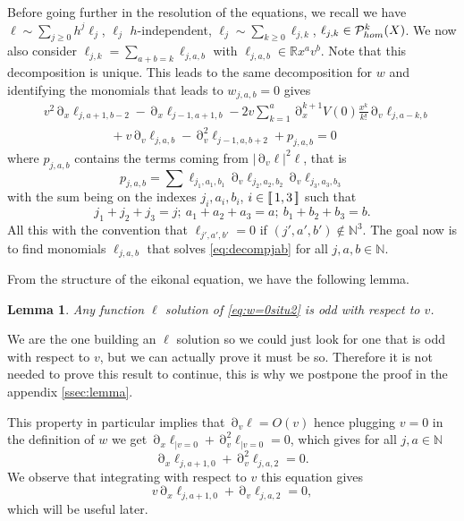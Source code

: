 \documentclass[12pt]{amsart}
\newcommand{\N}{\mathbb N}
\newcommand{\R}{\mathbb R}
\numberwithin{equation}{section}
\numberwithin{figure}{section}
\DeclareMathOperator{\p}{\partial}
\newcommand{\lb}{\operatorname{[\negthinspace [}}
\newcommand{\rb}{\operatorname{]\negthinspace ]}}
\newtheorem{lemma}[defin]{Lemma}
\begin{document}
Before going further in the resolution of the equations, we recall we have $\ell\sim\sum_{j\geq0}h^j\ell_j$, $\ell_j$ $h$-independent, $\ell_j\sim\sum_{k\geq0}\ell_{j,k}$, $\ell_{j,k}\in{\mathcal P}^k_{hom}(X)$. We now also consider $\ell_{j,k} = \sum_{a+b=k}\ell_{j,a,b}$ with $\ell_{j,a,b}\in\R x^av^b$. Note that this decomposition is unique. This leads to the same decomposition for $w$ and identifying the monomials that leads to $w_{j,a,b}=0$ gives
\begin{equation}\label{eq:decompjab}
\begin{aligned}
    &v^2\p_x\ell_{j,a+1,b-2} - \p_x\ell_{j-1,a+1,b} - 2v\sum_{k=1}^a\p_x^{k+1}V(0)\frac{x^k}{k!}\p_v\ell_{j,a-k,b}\\
    &\phantom{********}+ v\p_v\ell_{j,a,b} - \p_v^2\ell_{j-1,a,b+2} + p_{j,a,b} = 0
\end{aligned}
\end{equation}
where $p_{j,a,b}$ contains the terms coming from $|\p_v\ell|^2\ell$, that is
\begin{equation*}
p_{j,a,b} = \sum\ell_{j_1,a_1,b_1}\p_v\ell_{j_2,a_2,b_2}\p_v\ell_{j_3,a_3,b_3}
\end{equation*}
with the sum being on the indexes $j_i,a_i,b_i$, $i\in\lb1,3\rb$ such that
\begin{equation*}
j_1 + j_2 + j_3 = j;\ a_1 + a_2 + a_3 = a;\ b_1 + b_2 + b_3 = b.
\end{equation*}
All this with the convention that $\ell_{j',a',b'} = 0$ if $(j',a',b')\notin\N^3$. The goal now is to find monomials $\ell_{j,a,b}$ that solves \eqref{eq:decompjab} for all $j,a,b\in\N$.

From the structure of the eikonal equation, we have the following lemma.
\begin{lemma}\label{lem:situ2}
    Any function $\ell$ solution of \eqref{eq:w=0situ2} is odd with respect to $v$.
\end{lemma}
We are the one building an $\ell$ solution so we could just look for one that is odd with respect to $v$, but we can actually prove it must be so. Therefore it is not needed to prove this result to continue, this is why we postpone the proof in the appendix \ref{ssec:lemma}.

This property in particular implies that $\p_v\ell = O(v)$ hence plugging $v=0$ in the definition of $w$ we get $\p_x\ell_{|v=0} + \p_v^2\ell_{|v=0} = 0$, which gives for all $j,a\in\N$
\begin{equation*}
\p_x\ell_{j,a+1,0} + \p_v^2\ell_{j,a,2} = 0.
\end{equation*}
We observe that integrating with respect to $v$ this equation gives
\begin{equation}\label{eq:linkell2}
v\p_x\ell_{j,a+1,0} + \p_v\ell_{j,a,2} = 0,
\end{equation}
which will be useful later.
\end{document}
